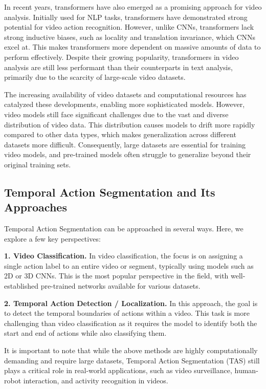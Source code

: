 In recent years, transformers have also emerged as a promising approach for video analysis. Initially used for NLP tasks, transformers have demonstrated strong potential for video action recognition. However, unlike CNNs, transformers lack strong inductive biases, such as locality and translation invariance, which CNNs excel at. This makes transformers more dependent on massive amounts of data to perform effectively. Despite their growing popularity, transformers in video analysis are still less performant than their counterparts in text analysis, primarily due to the scarcity of large-scale video datasets.

The increasing availability of video datasets and computational resources has catalyzed these developments, enabling more sophisticated models. However, video models still face significant challenges due to the vast and diverse distribution of video data. This distribution causes models to drift more rapidly compared to other data types, which makes generalization across different datasets more difficult. Consequently, large datasets are essential for training video models, and pre-trained models often struggle to generalize beyond their original training sets.

\subsection{Temporal Action Segmentation and Its Approaches}

Temporal Action Segmentation can be approached in several ways. Here, we explore a few key perspectives:

\noindent\textbf{1. Video Classification.} In video classification, the focus is on assigning a single action label to an entire video or segment, typically using models such as 2D or 3D CNNs. This is the most popular perspective in the field, with well-established pre-trained networks available for various datasets. 

\noindent\textbf{2. Temporal Action Detection / Localization.} In this approach, the goal is to detect the temporal boundaries of actions within a video. This task is more challenging than video classification as it requires the model to identify both the start and end of actions while also classifying them.

It is important to note that while the above methods are highly computationally demanding and require large datasets, Temporal Action Segmentation (TAS) still plays a critical role in real-world applications, such as video surveillance, human-robot interaction, and activity recognition in videos.

